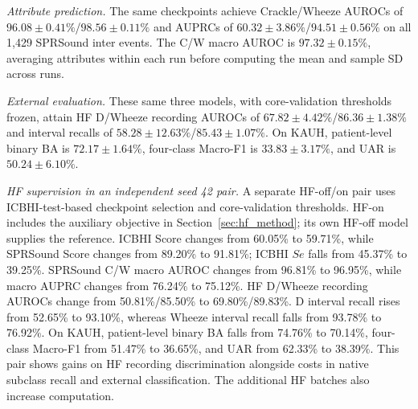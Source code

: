 \textit{Attribute prediction.}
The same checkpoints achieve Crackle/Wheeze AUROCs of
$96.08\pm0.41\%$/$98.56\pm0.11\%$ and AUPRCs of
$60.32\pm3.86\%$/$94.51\pm0.56\%$ on all 1,429 SPRSound inter events.
The C/W macro AUROC is $97.32\pm0.15\%$, averaging attributes within
each run before computing the mean and sample SD across runs.

\textit{External evaluation.}
These same three models, with core-validation thresholds frozen, attain
HF D/Wheeze recording AUROCs of $67.82\pm4.42\%$/$86.36\pm1.38\%$
and interval recalls of $58.28\pm12.63\%$/$85.43\pm1.07\%$.
On KAUH, patient-level binary BA is $72.17\pm1.64\%$, four-class
Macro-F1 is $33.83\pm3.17\%$, and UAR is $50.24\pm6.10\%$.

\textit{HF supervision in an independent seed 42 pair.}
A separate HF-off/on pair uses ICBHI-test-based checkpoint selection
and core-validation thresholds. HF-on includes the auxiliary objective
in Section~\ref{sec:hf_method}; its own HF-off model supplies the reference.
ICBHI Score changes from 60.05\% to 59.71\%, while SPRSound Score changes
from 89.20\% to 91.81\%; ICBHI $Se$ falls from 45.37\% to 39.25\%.
SPRSound C/W macro AUROC changes from 96.81\% to 96.95\%,
while macro AUPRC changes from 76.24\% to 75.12\%.
HF D/Wheeze recording AUROCs change from 50.81\%/85.50\% to
69.80\%/89.83\%. D interval recall rises from 52.65\% to 93.10\%,
whereas Wheeze interval recall falls from 93.78\% to 76.92\%.
On KAUH, patient-level binary BA falls from 74.76\% to 70.14\%,
four-class Macro-F1 from 51.47\% to 36.65\%, and UAR from 62.33\% to
38.39\%. This pair shows gains on HF recording discrimination alongside
costs in native subclass recall and external classification.
The additional HF batches also increase computation.


